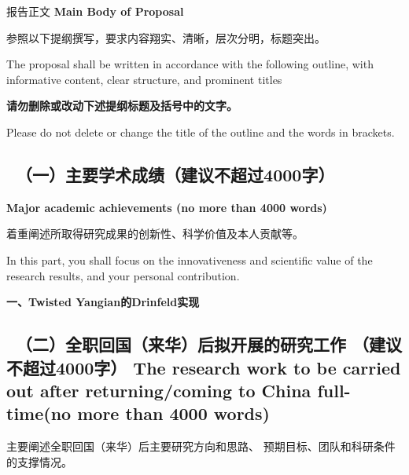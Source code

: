 \documentclass[12pt,UTF8,AutoFakeBold=2,a4paper]{ctexart}
\begin{document}
{\sanhao {} 报告正文 
\bfseries {} Main Body of Proposal}

{\sihao \kaishu  
参照以下提纲撰写，要求内容翔实、清晰，层次分明，标题突出。}

{\sihao {} The proposal shall be written in accordance 
with the following outline, with informative content, clear structure, 
and prominent titles}

{\sihao \kaishu \color{MsBlue} \bfseries 请勿删除或改动下述提纲标题及括号中的文字。}

{\sihao \color{MsBlue}  Please do not delete or 
change the title of the outline and the words in brackets.}



{\color{MsBlue} \subsection{\sihao \kaishu \quad \ 
\textbf{（一）主要学术成绩}（建议不超过4000字）}}

{\color{MsBlue} \xiaosihao {} 
\textbf{Major academic achievements (no more than 4000 words)}}

{\sihao \kaishu \color{MsBlue} 着重阐述所取得研究成果的创新性、科学价值及本人贡献等。}

{\color{MsBlue} \xiaosihao {} In this part, you shall 
focus on the innovativeness and scientific value of the research results, 
and your personal contribution.}

% 
% 


\textbf{\sihao 一、Twisted Yangian的Drinfeld实现}

{\color{MsBlue} \subsection{\sihao \kaishu \quad \ 
\textbf{（二）全职回国（来华）后拟开展的研究工作} （建议不超过4000字） 
\bfseries \xiaosihao \fontspec{Times New Roman} 
The research work to 
be carried out after returning/coming to China full-time(no more than 4000 words)} 
}

{\sihao \color{MsBlue} \kaishu 主要阐述全职回国（来华）后主要研究方向和思路、
预期目标、团队和科研条件的支撑情况。}
\end{document}
